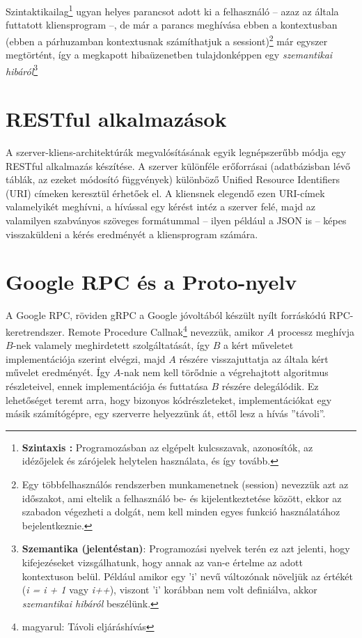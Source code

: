 \documentclass[tocnopagenum]{thesis-ekf}
\begin{document}
	Szintaktikailag\footnote{\textbf{Szintaxis :} Programozásban az elgépelt kulcsszavak, azonosítók, az idézőjelek és zárójelek helytelen használata, és így tovább.} ugyan helyes parancsot adott ki a felhasználó -- azaz az általa futtatott kliensprogram --, de már a parancs meghívása ebben a kontextusban (ebben a párhuzamban kontextusnak számíthatjuk a sessiont)\footnote{Egy többfelhasználós rendszerben munkamenetnek (session) nevezzük azt az időszakot, ami eltelik a felhasználó be- és kijelentkeztetése között, ekkor az szabadon végezheti a dolgát, nem kell minden egyes funkció használatához bejelentkeznie.} már egyszer megtörtént, így a megkapott hibaüzenetben tulajdonképpen egy \textit{szemantikai hibáról}\footnote{\textbf{Szemantika (jelentéstan)}: Programozási nyelvek terén ez azt jelenti, hogy kifejezéseket vizsgálhatunk, hogy annak az van-e értelme az adott kontextuson belül. Például amikor egy 'i' nevű változónak növeljük az értékét (\textit{i = i + 1} vagy \textit{i++}), viszont 'i' korábban nem volt definiálva, akkor \textit{szemantikai hibáról} beszélünk.}
	
	\section{RESTful alkalmazások}
	\label{rest}
	A szerver-kliens-architektúrák megvalósításának egyik legnépszerűbb módja egy RESTful alkalmazás készítése. A szerver különféle erőforrásai (adatbázisban lévő táblák, az ezeket módosító függvények) különböző Unified Resource Identifiers (URI) címeken keresztül érhetőek el. A kliensnek elegendő ezen URI-címek valamelyikét meghívni, a hívással egy kérést intéz a szerver felé, majd az valamilyen szabványos szöveges formátummal -- ilyen például a JSON is -- képes visszaküldeni a kérés eredményét a kliensprogram számára.
	
	\section{Google RPC és a Proto-nyelv}
	\label{grpc}
	A Google RPC, röviden gRPC a Google jóvoltából készült nyílt forráskódú RPC-keretrendszer. Remote Procedure Callnak\footnote{magyarul: Távoli eljáráshívás} nevezzük, amikor $A$ processz meghívja $B$-nek valamely meghirdetett szolgáltatását, így $B$ a kért műveletet implementációja szerint elvégzi, majd $A$ részére visszajuttatja az általa kért művelet eredményét. Így $A$-nak nem kell törődnie a végrehajtott algoritmus részleteivel, ennek implementációja és futtatása $B$ részére delegálódik. Ez lehetőséget teremt arra, hogy bizonyos kódrészleteket, implementációkat egy másik számítógépre, egy szerverre helyezzünk át, ettől lesz a hívás ''távoli''.
	
\end{document}
